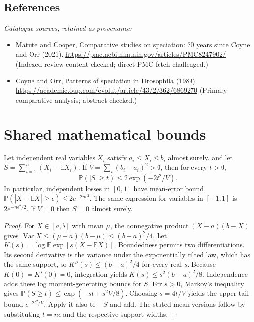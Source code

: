 \documentclass[11pt]{article}
\begin{document}
\subsection{References}
\noindent\emph{Catalogue sources, retained as provenance:}
\begin{itemize}
\item Matute and Cooper, Comparative studies on speciation: 30 years since Coyne and Orr (2021). \url{https://pmc.ncbi.nlm.nih.gov/articles/PMC8247902/} (Indexed review content checked; direct PMC fetch challenged.)
\item Coyne and Orr, Patterns of speciation in Drosophila (1989). \url{https://academic.oup.com/evolut/article/43/2/362/6869270} (Primary comparative analysis; abstract checked.)
\end{itemize}




\section{Shared mathematical bounds}\label{app:bounds}
\begin{lemma}\label{lem:bounded}
Let independent real variables $X_i$ satisfy $a_i\leq X_i\leq b_i$ almost surely,
and let $S=\sum_{i=1}^n(X_i-\mathbb{E} X_i)$. If
$V=\sum_i(b_i-a_i)^2>0$, then for every $t>0$,
\[
 \mathbb{P}(|S|\geq t)\leq 2\exp(-2t^2/V).
\]
In particular, independent losses in $[0,1]$ have mean-error bound
$\mathbb{P}(|\overline X-\mathbb{E}\overline X|\geq\epsilon)
\leq2e^{-2n\epsilon^2}$. The same expression for variables in $[-1,1]$
is $2e^{-n\epsilon^2/2}$. If $V=0$ then $S=0$ almost surely.
\end{lemma}
\begin{proof}
For $X\in[a,b]$ with mean $\mu$, the nonnegative product
$(X-a)(b-X)$ gives
$\operatorname{Var} X\leq(\mu-a)(b-\mu)\leq(b-a)^2/4$.
Let $K(s)=\log\mathbb{E}\exp[s(X-\mathbb{E} X)]$.
Boundedness permits two differentiations. Its second derivative is the variance
under the exponentially tilted law, which has the same support, so
$K''(s)\leq(b-a)^2/4$ for every real $s$.
Because $K(0)=K'(0)=0$, integration yields
$K(s)\leq s^2(b-a)^2/8$.
Independence adds these log moment-generating bounds for $S$.
For $s>0$, Markov's inequality gives
$\mathbb{P}(S\geq t)\leq\exp(-st+s^2V/8)$.
Choosing $s=4t/V$ yields the upper-tail bound $e^{-2t^2/V}$.
Apply it also to $-S$ and add. The stated mean versions follow by substituting
$t=n\epsilon$ and the respective support widths.
\end{proof}
\end{document}
